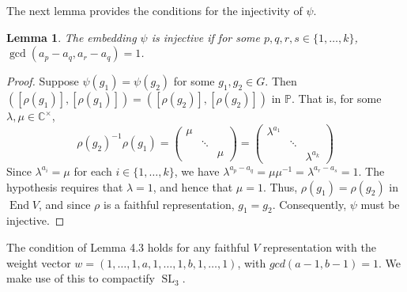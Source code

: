 \documentclass{amsart}
\newcommand{\C}{\mathbb{C}}
\newcommand{\Proj}{\mathbb{P}}
\DeclareMathOperator{\End}{End}
\DeclareMathOperator{\SL}{SL}
\newtheorem{lemma}[theorem]{Lemma}
\theoremstyle{definition}
\theoremstyle{remark}
\numberwithin{equation}{section}
\begin{document}
The next lemma provides the conditions for the injectivity of $\psi$.

\begin{lemma}
The embedding $\psi$ is injective if for some $p,q,r,s \in \{1, \ldots, k\}$, $\gcd(a_p-a_q,a_r-a_q) = 1$. 
\label{lem:inj}
\end{lemma}

\begin{proof}
    Suppose $\psi(g_1)=\psi(g_2)$ for some $g_1,g_2\in G$.
    Then $\left([\rho(g_1)], [\rho(g_1)]\right) = \left([\rho(g_2)], [\rho(g_2)]\right)$ in $\Proj$.
    That is, for some $\lambda, \mu \in \C^{\times}$,
    \begin{equation}
        \rho(g_2)^{-1}\rho(g_1)
        =
        \begin{pmatrix} \mu&&\\ &\ddots&\\ && \mu \end{pmatrix}
        =
        \begin{pmatrix}\lambda^{a_1}&&\\&\ddots&\\&&\lambda^{a_k}\end{pmatrix}
        \label{eq:inj}
    \end{equation}
        Since $\lambda^{a_i} = \mu$ for each $i \in \{1, \ldots, k\}$, we have $\lambda^{a_p-a_q} = \mu \mu^{-1} = \lambda^{a_r-a_s} = 1$. 
        The hypothesis requires that $\lambda=1$, and hence that $\mu=1$.
        Thus, $\rho(g_1) = \rho(g_2)$ in $\End V$, and since $\rho$ is a faithful representation, $g_1 = g_2$.
        Consequently, $\psi$ must be injective. 
\end{proof}
The condition of Lemma 4.3 holds for any faithful $V$ representation with the weight vector $w = (1, \ldots, 1, a, 1,\dots,1, b, 1, \ldots, 1)$, with $gcd(a-1, b-1) = 1$. We make use of this to compactify $\SL_3$. 



\theoremstyle{definition}
\newtheorem{exmp}{Example}[section]
\end{document}
